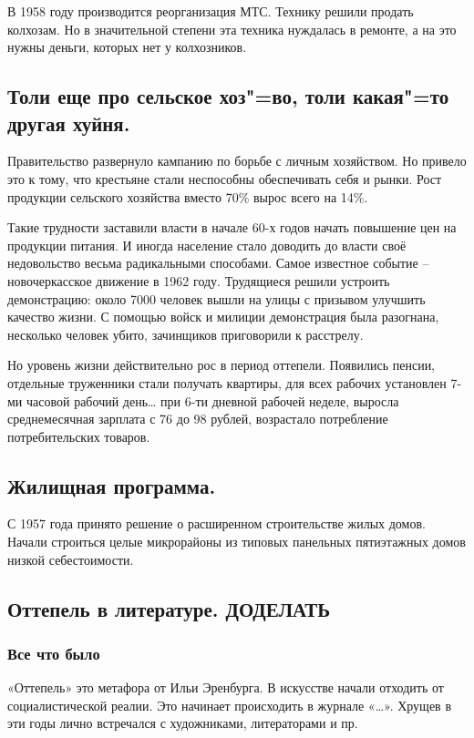 В 1958 году производится реорганизация МТС. Технику решили продать колхозам. Но в значительной степени эта техника нуждалась в ремонте, а на это нужны деньги, которых нет у колхозников.

\subsection{Толи еще про сельское хоз"=во, толи какая"=то другая хуйня.}

Правительство развернуло кампанию по борьбе с личным хозяйством. Но привело это к тому, что крестьяне стали неспособны обеспечивать себя и рынки. Рост продукции сельского хозяйства вместо 70\% вырос всего на 14\%.

Такие трудности заставили власти в начале 60-х годов начать повышение цен на продукции питания. И иногда население стало доводить до власти своё недовольство весьма радикальными способами. Самое известное событие – новочеркасское движение в 1962 году. Трудящиеся решили устроить демонстрацию: около 7000 человек вышли на улицы с призывом улучшить качество жизни. С помощью войск и милиции демонстрация была разогнана, несколько человек убито, зачинщиков приговорили к расстрелу.

Но уровень жизни действительно рос в период оттепели. Появились пенсии, отдельные труженники стали получать квартиры, для всех рабочих установлен 7-ми часовой рабочий день… при 6-ти дневной рабочей неделе, выросла среднемесячная зарплата с 76 до 98 рублей, возрастало потребление потребительских товаров.

\subsection{Жилищная программа.}

С 1957 года принято решение о расширенном строительстве жилых домов. Начали строиться целые микрорайоны из типовых панельных пятиэтажных домов низкой себестоимости.

\subsection{Оттепель в литературе. \textbf{ДОДЕЛАТЬ}}

\subsubsection{\textbf{Все что было}}

«Оттепель» это метафора от Ильи Эренбурга. В искусстве начали отходить от социалистической реалии. Это начинает происходить в журнале «…». Хрущев в эти годы лично встречался с художниками, литераторами и пр.

